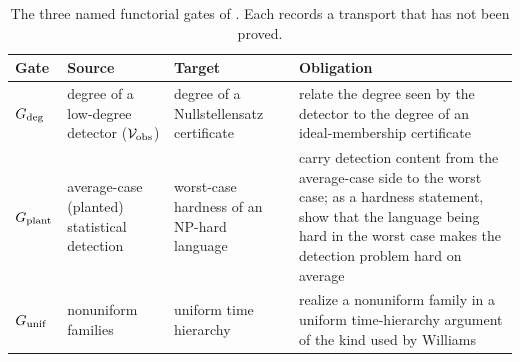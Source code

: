 \begin{table}[H]
  \centering
  \caption{The three named functorial gates of .  Each records a transport that has not been proved.}
  \label{tab:functorial-gates}
  \small
  \renewcommand{\arraystretch}{1.1}
  \begin{tabularx}{\textwidth}{@{}>{\raggedright\arraybackslash}p{}>{\raggedright\arraybackslash}p{}>{\raggedright\arraybackslash}p{}>{\raggedright\arraybackslash}X@{}}
    \toprule
    Gate & Source & Target & Obligation \\
    \midrule
    \(G_{\mathrm{deg}}\) & degree of a low-degree detector (\(\mathcal{V}_{\text{obs}}\)) & degree of a Nullstellensatz certificate & relate the degree seen by the detector to the degree of an ideal-membership certificate \\
    \(G_{\mathrm{plant}}\) & average-case (planted) statistical detection & worst-case hardness of an NP-hard language & carry detection content from the average-case side to the worst case; as a hardness statement, show that the language being hard in the worst case makes the detection problem hard on average \\
    \(G_{\mathrm{unif}}\) & nonuniform families & uniform time hierarchy & realize a nonuniform family in a uniform time-hierarchy argument of the kind used by Williams \cite{Williams2014NonUniformACC} \\
    \bottomrule
  \end{tabularx}
\end{table}
